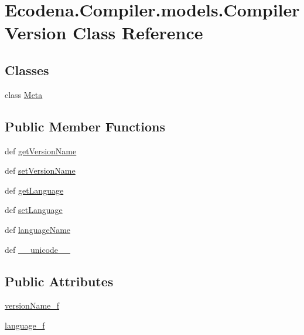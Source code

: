 \hypertarget{class_ecodena_1_1_compiler_1_1models_1_1_compiler_version}{
\section{Ecodena.Compiler.models.CompilerVersion Class Reference}
\label{d0/d33/class_ecodena_1_1_compiler_1_1models_1_1_compiler_version}
}
\subsection*{Classes}
\begin{DoxyCompactItemize}
\item 
class \hyperlink{class_ecodena_1_1_compiler_1_1models_1_1_compiler_version_1_1_meta}{Meta}
\end{DoxyCompactItemize}
\subsection*{Public Member Functions}
\begin{DoxyCompactItemize}
\item 
def \hyperlink{class_ecodena_1_1_compiler_1_1models_1_1_compiler_version_a6390cd7dabb83ba668a91e0662a18392}{getVersionName}
\item 
def \hyperlink{class_ecodena_1_1_compiler_1_1models_1_1_compiler_version_a16d1377cf42fc650880a5bf638849777}{setVersionName}
\item 
def \hyperlink{class_ecodena_1_1_compiler_1_1models_1_1_compiler_version_a4a6ef9d1a186c9375e379db042ce0fe4}{getLanguage}
\item 
def \hyperlink{class_ecodena_1_1_compiler_1_1models_1_1_compiler_version_a8756e34a68df992bff41141c3f670cc7}{setLanguage}
\item 
def \hyperlink{class_ecodena_1_1_compiler_1_1models_1_1_compiler_version_a1c658555d5032dfda27032e3086bacb8}{languageName}
\item 
def \hyperlink{class_ecodena_1_1_compiler_1_1models_1_1_compiler_version_a5692b5f6df89792ce3ad95671d936ec5}{\_\-\_\-unicode\_\-\_\-}
\end{DoxyCompactItemize}
\subsection*{Public Attributes}
\begin{DoxyCompactItemize}
\item 
\hyperlink{class_ecodena_1_1_compiler_1_1models_1_1_compiler_version_a291df582643fb8a9656fa606d0aeb2fb}{versionName\_\-f}
\item 
\hyperlink{class_ecodena_1_1_compiler_1_1models_1_1_compiler_version_a0fee66404857026401c70f1fa579600e}{language\_\-f}
\end{DoxyCompactItemize}

